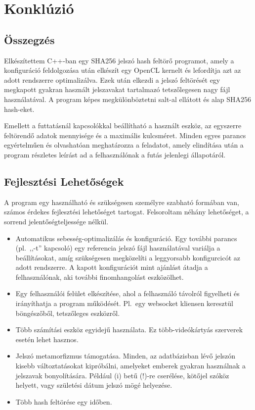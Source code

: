 \chapter{Konklúzió} %




\section{Összegzés}

\label{ch:sum}

Elkészítettem C++-ban egy SHA256 jelszó hash feltörő programot, amely a konfiguráció feldolgozása után elkészít egy OpenCL kernelt és lefordítja azt az adott rendszerre optimalizálva. Ezek után elkezdi a jelszó feltörését egy megkapott gyakran használt jelszavakat tartalmazó tetszőlegesen nagy fájl használatával. A program képes megkülönböztetni salt-al ellátott és alap SHA256 hash-eket.

Emellett a futtatásnál kapcsolókkal beállítható a használt eszköz, az egyszerre feltörendő adatok mennyisége és a maximális kulcsméret. Minden egyes parancs egyértelműen és olvashatóan meghatározza a feladatot, amely elindítása után a program részletes leírást ad a felhasználónak a futás jelenlegi állapotáról.




\section{Fejlesztési Lehetőségek}

A program egy használható és szükségesen személyre szabható formában van, számos érdekes fejlesztési lehetőséget tartogat. Felsoroltam néhány lehetőséget, a sorrend jelentőségteljessége nélkül.

\begin{itemize}
    \item Automatikus sebesség-optimalizálás és konfiguráció. Egy további parancs (pl.\ ,,-t'' kapcsoló) egy referencia jelszó fájl használatával variálja a  beállításokat, amíg szükségesen megközelíti a leggyorsabb konfigurcicót az adott rendszerre. A kapott konfigurációt mint ajánlást átadja a felhasználónak, aki további finomhangolást eszközölhet.
    \item Egy felhasználói felület elkészítése, ahol a felhasználó távolról figyelheti és irányíthatja a program működését. Pl.\ egy websocket kliensen keresztül böngészőből, tetszőleges eszközről.
    \item Több számítási eszköz egyidejű használata. Ez több-videókártyás szerverek esetén lehet hasznos.
    \item Jelszó metamorfizmus támogatása. Minden, az adatbázisban lévő jelszón kisebb változtatásokat kipróbálni, amelyeket emberek gyakran használnak a jelszavak bonyolítására. Például (i) betű (!)-re cserélése, kötőjel szóköz helyett, vagy születési dátum jelszó mögé helyezése.
    \item Több hash feltörése egy időben.
\end{itemize}